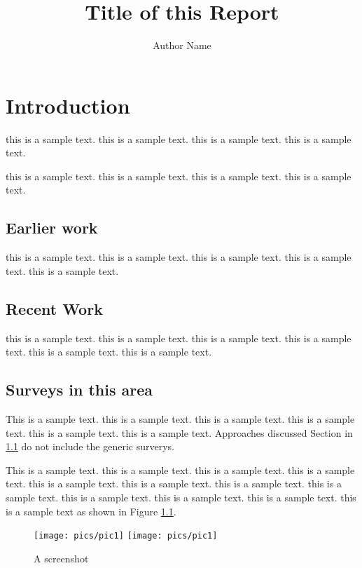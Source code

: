 \documentclass{report}
\title{Title of this Report}
\author {Author Name}
\begin{document}
\maketitle
\tableofcontents

\chapter{Introduction}

this is  a sample text.  this is  a sample text.  this is  a sample text.  this is  a sample text.  


this is  a sample text.
this is  a sample text.
this is  a sample text.
this is  a sample text.

\section{Earlier work} \label{ew}

this is  a sample text.
this is  a sample text.
this is  a sample text.
this is  a sample text.
this is  a sample text.

\section{Recent Work}

this is  a sample text.
this is  a sample text.
this is  a sample text.
this is  a sample text.
this is  a sample text.
this is  a sample text.

\section{Surveys in this area}

This is  a sample text.
this is  a sample text.
this is  a sample text.
this is  a sample text.
this is  a sample text.
this is  a sample text.
Approaches discussed Section in \ref{ew} do not include
the generic surverys.

This is  a sample text.
this is  a sample text.
this is  a sample text.
this is  a sample text.
this is  a sample text.
this is  a sample text.
this is  a sample text.
this is  a sample text.
this is  a sample text.
this is  a sample text.
this is  a sample text.
this is  a sample text as shown in Figure \ref{figsc}.

\begin{figure}
\texttt{[image: pics/pic1]}
\texttt{[image: pics/pic1]}
\caption{A screenshot}
\label{figsc}
\end{figure}
\end{document}

